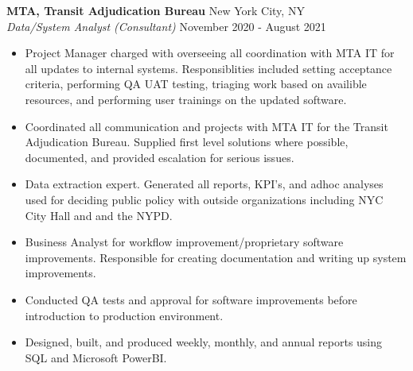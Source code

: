 \documentclass[a4paper]{article}
\begin{document}
\textbf{MTA, Transit Adjudication Bureau} \hfill New York City, NY\\
\textit{Data/System Analyst (Consultant)} \hfill November 2020 - August 2021\\
\vspace{-1mm}
\begin{itemize} \itemsep 1pt
    \item Project Manager charged with overseeing all coordination with MTA IT for all updates to internal systems. Responsiblities included setting acceptance criteria, performing QA UAT testing, triaging work based on availible resources, and performing user trainings on the updated software.
	\item Coordinated all communication and projects with MTA IT for the Transit Adjudication Bureau. Supplied first level solutions where possible, documented, and provided escalation for serious issues.
	\item Data extraction expert. Generated all reports, KPI's, and adhoc analyses used for deciding public policy with outside organizations including NYC City Hall and and the NYPD.
    \item Business Analyst for workflow improvement/proprietary software improvements. Responsible for creating documentation and writing up system improvements.
	\item Conducted QA tests and approval for software improvements before introduction to production environment.
	\item Designed, built, and produced weekly, monthly, and annual reports using SQL and Microsoft PowerBI.
\end{itemize}
\end{document}
